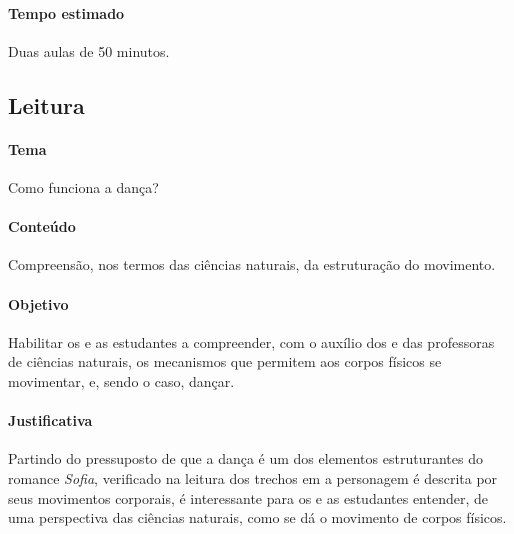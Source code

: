 \documentclass[12pt]{extarticle}
\begin{document}
\paragraph{Tempo estimado} Duas aulas de 50 minutos.

 
 






\subsection{Leitura}

\paragraph{Tema} Como funciona a dança?

\paragraph{Conteúdo} Compreensão, nos termos das ciências naturais, da estruturação do movimento.

\paragraph{Objetivo} Habilitar os e as estudantes a compreender, com o auxílio dos e das professoras
de ciências naturais, os mecanismos que permitem aos corpos físicos se movimentar, e, sendo o caso,
dançar.

\paragraph{Justificativa} Partindo do pressuposto de que a dança é um dos elementos estruturantes
do romance \textit{Sofia}, verificado na leitura dos trechos em a personagem é descrita por seus
movimentos corporais, é interessante para os e as estudantes entender, de uma perspectiva
das ciências naturais, como se dá o movimento de corpos físicos. 
\end{document}

